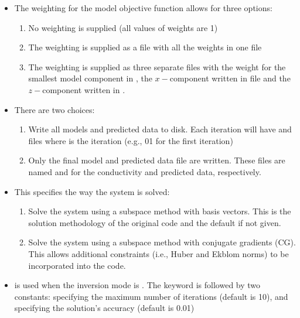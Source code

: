 \begin{itemize}
\begin{enumerate}
\end{enumerate}
%
\item[\fileName{WEIGHT}] The weighting for the model objective function allows for three options:
\begin{enumerate}
\item{} No weighting is supplied (all values of weights are 1)
\item{} The weighting is supplied as a  file with all the weights in one file 
\item{} The weighting is supplied as three separate  files with the weight for the smallest model component in , the $x-$component written in file  and the $z-$component written in .
\end{enumerate}
%
\item[{\scriptsize\fileName{STORE\_ALL\_MODELS}}] There are two choices:
\begin{enumerate}
\item{} Write all models and predicted data to disk. Each iteration will have  and  files where  is the iteration (e.g., 01 for the first iteration)
\item{} Only the final model and predicted data file are written. These files are named  and  for the conductivity and predicted data, respectively.
\end{enumerate}
%
\item[\fileName{INVMODE}] This specifies the way the system is solved: 
\begin{enumerate}
\item{} Solve the system using a subspace method with basis vectors. This is the solution methodology of the original code and the default if not given.
\item{} Solve the system using a subspace method with conjugate gradients (CG). This allows additional constraints (i.e., Huber and Ekblom norms) to be incorporated into the code.
\end{enumerate}
%
\item[\fileName{CG\_PARAM}] is used when the inversion mode is . The keyword is followed by two constants:  specifying the maximum number of iterations (default is 10), and  specifying the solution's accuracy (default is 0.01)

\end{itemize}
